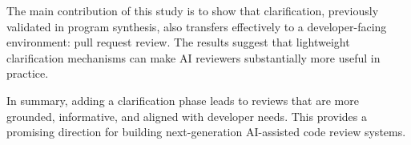 \documentclass[conference]{IEEEtran}
\begin{document}
The main contribution of this study is to show that clarification, previously validated in program synthesis, also transfers effectively to a developer-facing environment: pull request review. The results suggest that lightweight clarification mechanisms can make AI reviewers substantially more useful in practice.

In summary, adding a clarification phase leads to reviews that are more grounded, informative, and aligned with developer needs. This provides a promising direction for building next-generation AI-assisted code review systems.



\end{document}
